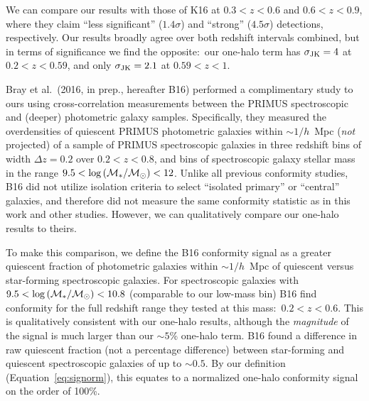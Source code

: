 We can compare our results with those of K16 at ${0.3<z<0.6}$ and ${0.6<z<0.9}$, where they claim 
``less significant'' ($1.4\sigma$) and ``strong'' ($4.5\sigma$) detections, respectively.
Our results broadly agree over both redshift intervals combined, but in terms of significance we find the opposite:~our one-halo term has ${\sigmaJK=4}$ at ${0.2<z<0.59}$, and only ${\sigmaJK=2.1}$ at ${0.59<z<1}$.

Bray et al.~(2016, in prep., hereafter B16) performed a complimentary study to ours using 
cross-correlation measurements between the PRIMUS spectroscopic and (deeper) photometric galaxy samples.
Specifically, they measured the overdensities of quiescent PRIMUS photometric galaxies within $\sim1/h$~Mpc 
(\emph{not} projected) of a sample of PRIMUS spectroscopic galaxies in three redshift bins of width ${\Delta z=0.2}$ over ${0.2<z<0.8}$, 
and bins of spectroscopic galaxy stellar mass in the range ${9.5<\logM<12}$.
Unlike all previous conformity studies, B16 did not utilize isolation criteria to select ``isolated primary'' or ``central'' galaxies, and therefore did not measure the same conformity statistic as in this work and other studies.
However, we can qualitatively compare our one-halo results to theirs.

To make this comparison, we define the B16 conformity signal as a greater quiescent fraction of photometric galaxies within $\sim1/h$~Mpc of quiescent versus star-forming spectroscopic galaxies.
For spectroscopic galaxies with ${9.5 < \logM < 10.8}$ (comparable to our low-mass bin) B16 find conformity for the full redshift range they tested at this mass:~${0.2<z<0.6}$.
This is qualitatively consistent with our one-halo results, although the \emph{magnitude} of the signal is much larger than our $\sim5$\% one-halo term.
B16 found a difference in raw quiescent fraction (not a percentage difference) between star-forming and quiescent spectroscopic galaxies of up to $\sim0.5$.
By our definition (Equation~\ref{eq:signorm}), this equates to a normalized one-halo conformity signal on the order of 100\%.

